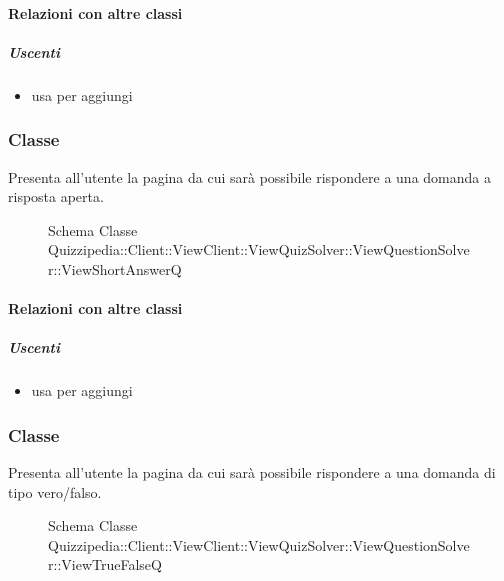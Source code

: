\paragraph{Relazioni con altre classi}
\subparagraph{Uscenti}
\begin{itemize}
\item usa  per aggiungi
\end{itemize}
\subsubsection{Classe }
Presenta all'utente la pagina da cui sarà possibile rispondere a una domanda a risposta aperta.
\begin{figure}[H]
\centering
\noindent{}
\caption[Schema Classe ViewShortAnswerQ]{Schema Classe Quizzipedia::Client::ViewClient::ViewQuizSolver::ViewQuestionSolver::ViewShortAnswerQ}
\end{figure}
\paragraph{Relazioni con altre classi}
\subparagraph{Uscenti}
\begin{itemize}
\item usa  per aggiungi
\end{itemize}
\subsubsection{Classe }
Presenta all'utente la pagina da cui sarà possibile rispondere a una domanda di tipo vero/falso.
\begin{figure}[H]
\centering
\noindent{}
\caption[Schema Classe ViewTrueFalseQ]{Schema Classe Quizzipedia::Client::ViewClient::ViewQuizSolver::ViewQuestionSolver::ViewTrueFalseQ}
\end{figure}
